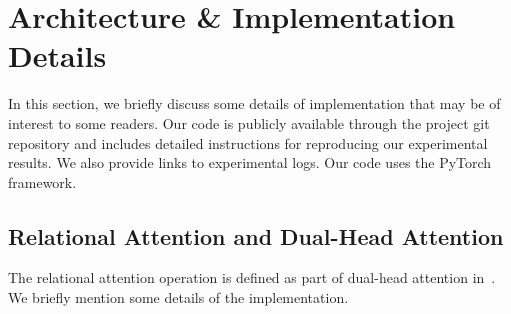 \section{Architecture \& Implementation Details}\label{sec:appendix_implementation}

In this section, we briefly discuss some details of implementation that may be of interest to some readers. Our code is publicly available through the project git repository and includes detailed instructions for reproducing our experimental results. We also provide links to experimental logs. Our code uses the PyTorch framework.

\subsection{Relational Attention and Dual-Head Attention}

The relational attention operation is defined as part of dual-head attention in~. We briefly mention some details of the implementation. 

